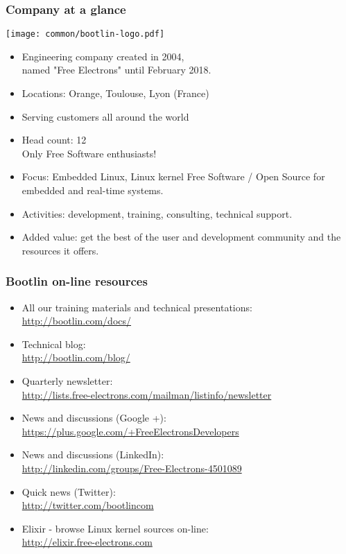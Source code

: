 \begin{frame}
\frametitle{Company at a glance}
  \texttt{[image: common/bootlin-logo.pdf]}
  \begin{itemize}
    \item Engineering company created in 2004,\\
          named "Free Electrons" until February 2018.
    \item Locations: Orange, Toulouse, Lyon (France)
    \item Serving customers all around the world
    \item Head count: 12 \\
	  Only Free Software enthusiasts!
    \item Focus: Embedded Linux, Linux kernel
          Free Software / Open Source
          for embedded and real-time systems.
    \item Activities: development, training, consulting, technical
          support.
    \item Added value: get the best of the user and development
          community and the resources it offers.
  \end{itemize}
\end{frame}

\begin{frame}
\frametitle{Bootlin on-line resources}
  \begin{itemize}
    \item All our training materials and technical presentations:\\
          \url{http://bootlin.com/docs/}
    \item Technical blog:\\
          \url{http://bootlin.com/blog/}
    \item Quarterly newsletter:\\
 	  \url{http://lists.free-electrons.com/mailman/listinfo/newsletter}
    \item News and discussions (Google +):\\
	  \url{https://plus.google.com/+FreeElectronsDevelopers}
    \item News and discussions (LinkedIn):\\
	  \url{http://linkedin.com/groups/Free-Electrons-4501089}
    \item Quick news (Twitter):\\
          \url{http://twitter.com/bootlincom}
    \item Elixir - browse Linux kernel sources on-line:\\
          \url{http://elixir.free-electrons.com}
  \end{itemize}
\end{frame}

